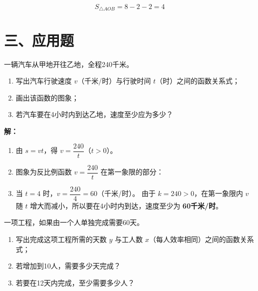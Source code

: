 \documentclass[12pt, a4paper]{ctexart}
\begin{document}
\[
  S_{\triangle AOB} = 8 - 2 - 2 = 4
\]

\newpage
\section*{\textcolor{apppurple}{三、应用题}}

\begin{appbox}[【应用1】行程问题]
一辆汽车从甲地开往乙地，全程240千米。
\begin{enumerate}[label=(\arabic*)]
  \item 写出汽车行驶速度 $v$（千米/时）与行驶时间 $t$（时）之间的函数关系式；
  \item 画出该函数的图象；
  \item 若汽车要在4小时内到达乙地，速度至少应为多少？
\end{enumerate}
\end{appbox}

\textbf{解：}
\begin{enumerate}[label=(\arabic*)]
  \item 由 $s = vt$，得 $v = \dfrac{240}{t}$（$t > 0$）。

  \item 图象为反比例函数 $v = \dfrac{240}{t}$ 在第一象限的部分：
  \begin{center}
  \end{center}

  \item 当 $t = 4$ 时，$v = \dfrac{240}{4} = 60$（千米/时）。
  由于 $k = 240 > 0$，在第一象限内 $v$ 随 $t$ 增大而减小，所以要在4小时内到达，速度至少为 \textbf{60千米/时}。
\end{enumerate}

\begin{appbox}[【应用2】工程问题]
一项工程，如果由一个人单独完成需要60天。
\begin{enumerate}[label=(\arabic*)]
  \item 写出完成这项工程所需的天数 $y$ 与工人数 $x$（每人效率相同）之间的函数关系式；
  \item 若增加到10人，需要多少天完成？
  \item 若要在12天内完成，至少需要多少人？
\end{enumerate}
\end{appbox}
\end{document}

